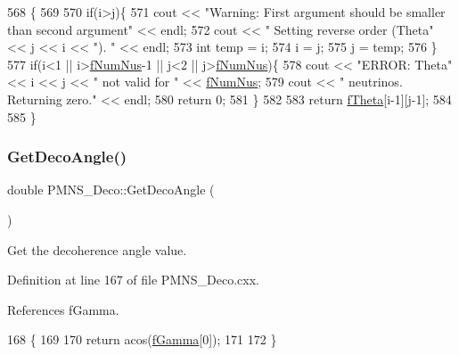 \begin{DoxyCode}
568 \{
569 
570   \textcolor{keywordflow}{if}(i>j)\{
571     cout << \textcolor{stringliteral}{"Warning: First argument should be smaller than second argument"} << endl;
572     cout << \textcolor{stringliteral}{"         Setting reverse order (Theta"} << j << i << \textcolor{stringliteral}{"). "} << endl;
573     \textcolor{keywordtype}{int} temp = i;
574     i = j;
575     j = temp;
576   \}
577   \textcolor{keywordflow}{if}(i<1 || i>\hyperlink{classOscProb_1_1PMNS__Base_a24bb74bed63569dfe88b18fa6a08060e}{fNumNus}-1 || j<2 || j>\hyperlink{classOscProb_1_1PMNS__Base_a24bb74bed63569dfe88b18fa6a08060e}{fNumNus})\{
578     cout << \textcolor{stringliteral}{"ERROR: Theta"} << i << j << \textcolor{stringliteral}{" not valid for "} << \hyperlink{classOscProb_1_1PMNS__Base_a24bb74bed63569dfe88b18fa6a08060e}{fNumNus};
579     cout << \textcolor{stringliteral}{" neutrinos. Returning zero."} << endl;
580     \textcolor{keywordflow}{return} 0;
581   \}
582 
583   \textcolor{keywordflow}{return} \hyperlink{classOscProb_1_1PMNS__Base_a1976887cd658dd86b2336c181f1470b4}{fTheta}[i-1][j-1];
584 
585 \}
\end{DoxyCode}
\mbox{\label{classOscProb_1_1PMNS__Deco_a5dadf6a39dec4a229babeff6a650179c}} 
\subsubsection{\texorpdfstring{Get\+Deco\+Angle()}{GetDecoAngle()}}
{\footnotesize\ttfamily double P\+M\+N\+S\+\_\+\+Deco\+::\+Get\+Deco\+Angle (\begin{DoxyParamCaption}{ }\end{DoxyParamCaption})\hspace{0.3cm}{\ttfamily [virtual]}}

Get the decoherence angle value. 

Definition at line 167 of file P\+M\+N\+S\+\_\+\+Deco.\+cxx.



References f\+Gamma.


\begin{DoxyCode}
168 \{
169 
170   \textcolor{keywordflow}{return} acos(\hyperlink{classOscProb_1_1PMNS__Deco_ae2f30ac9f8b25344959f1698616d337a}{fGamma}[0]);
171   
172 \}
\end{DoxyCode}
\mbox{\label{classOscProb_1_1PMNS__Base_adb8dbc91d4286d2e7c8f768c59476241}} 
